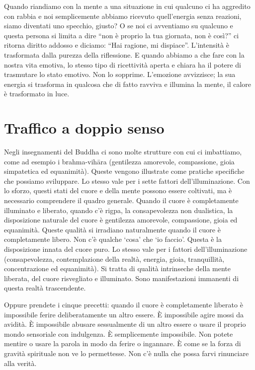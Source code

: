 Quando riandiamo con la mente a una situazione in cui qualcuno ci ha aggredito con rabbia e noi semplicemente abbiamo ricevuto quell'energia senza reazioni, siamo diventati uno specchio, giusto? O se noi ci avventiamo su qualcuno e questa persona si limita a dire ``non è proprio la tua giornata, non è così?'' ci ritorna diritto addosso e diciamo: ``Hai ragione, mi dispiace''. L'intensità è trasformata dalla purezza della riflessione. E quando abbiamo a che fare con la nostra vita emotiva, lo stesso tipo di ricettività aperta e chiara ha il potere di trasmutare lo stato emotivo. Non lo sopprime. L'emozione avvizzisce; la sua energia si trasforma in qualcosa che di fatto ravviva e illumina la mente, il calore è trasformato in luce.

\section*{Traffico a doppio senso}

Negli insegnamenti del Buddha ci sono molte strutture con cui ci imbattiamo, come ad esempio i brahma-vihāra (gentilezza amorevole, compassione, gioia simpatetica ed equanimità). Queste vengono illustrate come pratiche specifiche che possiamo sviluppare. Lo stesso vale per i sette fattori dell'illuminazione. Con lo sforzo, questi stati del cuore e della mente possono essere coltivati, ma è necessario comprendere il quadro generale. Quando il cuore è completamente illuminato e liberato, quando c'è rigpa, la consapevolezza non dualistica, la disposizione naturale del cuore è gentilezza amorevole, compassione, gioia ed equanimità. Queste qualità si irradiano naturalmente quando il cuore è completamente libero. Non c'è qualche `cosa' che `io faccio'. Questa è la disposizione innata del cuore puro. Lo stesso vale per i fattori dell'illuminazione (consapevolezza, contemplazione della realtà, energia, gioia, tranquillità, concentrazione ed equanimità). Si tratta di qualità intrinseche della mente liberata, del cuore risvegliato e illuminato. Sono manifestazioni immanenti di questa realtà trascendente.

Oppure prendete i cinque precetti: quando il cuore è completamente liberato è impossibile ferire deliberatamente un altro essere. È impossibile agire mossi da avidità. È impossibile abusare sessualmente di un altro essere o usare il proprio mondo sensoriale con indulgenza. È semplicemente impossibile. Non potete mentire o usare la parola in modo da ferire o ingannare. È come se la forza di gravità spirituale non ve lo permettesse. Non c'è nulla che possa farvi rinunciare alla verità. 


